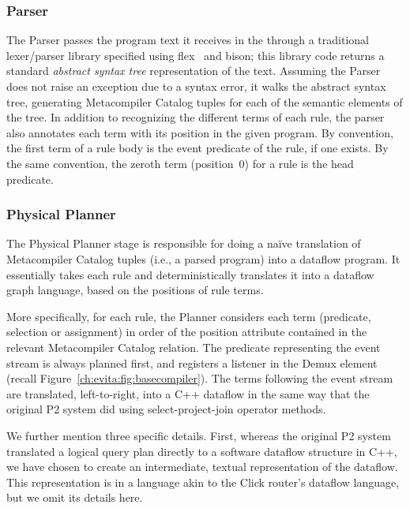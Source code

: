 \subsubsection{Parser}
\label{ch:evita:sec:parser}

The Parser passes the program text it receives in the 
through a traditional lexer/parser library specified using
flex~\cite{flexUrl} and bison\cite{bisonUrl}; this library code returns
a standard {\em abstract syntax tree} representation of the text.
Assuming the Parser does not raise an exception due to a syntax error,
it walks the abstract syntax tree, generating Metacompiler Catalog
tuples for each of the semantic elements of the tree. In addition to
recognizing the different terms of each rule, the parser also annotates
each term with its position in the given program.  By convention, the
first term of a rule body is the event predicate of the rule, if one
exists.  By the same convention, the zeroth term (position~$0$) for a
rule is the head predicate.



\subsubsection{Physical Planner}
\label{ch:evita:sec:planner}

The Physical Planner stage is responsible for doing a na\"{i}ve translation of
Metacompiler Catalog tuples (i.e., a parsed \OVERLOG program) into a dataflow
program.  It essentially takes each rule and deterministically translates it
into a dataflow graph language, based on the positions of rule terms.

More specifically, for each rule, the Planner considers each term (predicate,
selection or assignment) in order of the position attribute contained in the
relevant Metacompiler Catalog relation.  The predicate representing the event
stream is always planned first, and registers a listener in the Demux element
(recall Figure~\ref{ch:evita:fig:basecompiler}).  The terms following the event
stream are translated, left-to-right, into a C++ dataflow in the same way that
the original P2 system did using select-project-join operator methods.

We further mention three specific details.  First, whereas the original P2
system translated a logical query plan directly to a software dataflow
structure in C++, we have chosen to create an intermediate, textual
representation of the dataflow.  This representation is in a language akin to
the Click router's dataflow language, but we omit its details here.

